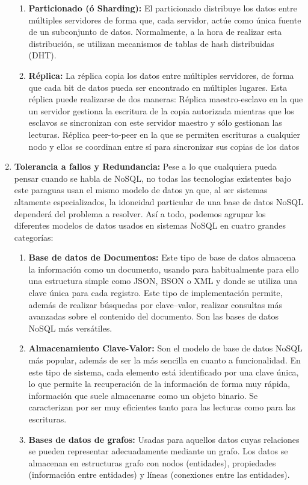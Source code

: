 \begin{enumerate}
\begin{enumerate}
\item \textbf{Particionado (ó Sharding):} El particionado distribuye los datos entre múltiples servidores de forma que, cada servidor, actúe como única fuente de un subconjunto de datos. Normalmente, a la hora de realizar esta distribución, se utilizan mecanismos de tablas de hash distribuidas (DHT). 
\item \textbf{Réplica:} La réplica copia los datos entre múltiples servidores, de forma que cada bit de datos pueda ser encontrado en múltiples lugares. Esta réplica puede realizarse de dos maneras:
Réplica maestro-esclavo en la que un servidor gestiona la escritura de la copia autorizada mientras que los esclavos se sincronizan con este servidor maestro y sólo gestionan las lecturas.
Réplica peer-to-peer en la que se permiten escrituras a cualquier nodo y ellos se coordinan entre sí para sincronizar sus copias de los datos
\end{enumerate}
\item \textbf{Tolerancia a fallos y Redundancia: } Pese a lo que cualquiera pueda pensar cuando se habla de NoSQL, no todas las tecnologías existentes bajo este paraguas usan el mismo modelo de datos ya que, al ser sistemas altamente especializados, la idoneidad particular de una base de datos NoSQL dependerá del problema a resolver. Así a todo, podemos agrupar los diferentes modelos de datos usados en sistemas NoSQL en cuatro grandes categorías:
\begin{enumerate}
\item \textbf{Base de datos de Documentos: } Este tipo de base de datos almacena la información como un documento, usando para habitualmente para ello una estructura simple como JSON, BSON o XML y donde se utiliza una clave única para cada registro. Este tipo de implementación permite, además de realizar búsquedas por clave–valor, realizar consultas más avanzadas sobre el contenido del documento. Son las bases de datos NoSQL más versátiles.
\item \textbf{Almacenamiento Clave-Valor:} Son el modelo de base de datos NoSQL más popular, además de ser la más sencilla en cuanto a funcionalidad. En este tipo de sistema, cada elemento está identificado por una clave única, lo que permite la recuperación de la información de forma muy rápida, información que suele almacenarse como un objeto binario. Se caracterizan por ser muy eficientes tanto para las lecturas como para las escrituras. 
\item \textbf{Bases de datos de grafos:} Usadas para aquellos datos cuyas relaciones se pueden representar adecuadamente mediante un grafo. Los datos se almacenan en estructuras grafo con nodos (entidades), propiedades (información entre entidades) y líneas (conexiones entre las entidades). 

\end{enumerate}
\end{enumerate}
